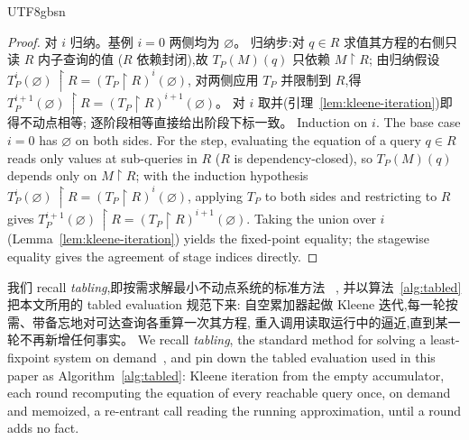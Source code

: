 \begin{CJK*}{UTF8}{gbsn}
\begin{proof}
\ifPaperChinese
  对 $i$ 归纳。基例 $i = 0$ 两侧均为 $\varnothing$。
  归纳步:对 $q \in R$ 求值其方程的右侧只读 $R$ 内子查询的值
  ($R$ 依赖封闭),故 $T_P(M)(q)$ 只依赖 $M{\restriction}R$;
  由归纳假设
  $T_P^i(\varnothing)\,{\restriction}R = (T_P{\restriction}R)^i(\varnothing)$,
  对两侧应用 $T_P$ 并限制到 $R$,得
  $T_P^{i+1}(\varnothing)\,{\restriction}R = (T_P{\restriction}R)^{i+1}(\varnothing)$。
  对 $i$ 取并(引理~\ref{lem:kleene-iteration})即得不动点相等;
  逐阶段相等直接给出阶段下标一致。
\else
  Induction on $i$. The base case $i = 0$ has $\varnothing$ on both
  sides. For the step, evaluating the equation of a query $q \in R$
  reads only values at sub-queries in $R$ ($R$ is dependency-closed),
  so $T_P(M)(q)$ depends only on $M{\restriction}R$; with the
  induction hypothesis
  $T_P^i(\varnothing)\,{\restriction}R = (T_P{\restriction}R)^i(\varnothing)$,
  applying $T_P$ to both sides and restricting to $R$ gives
  $T_P^{i+1}(\varnothing)\,{\restriction}R = (T_P{\restriction}R)^{i+1}(\varnothing)$.
  Taking the union over $i$ (Lemma~\ref{lem:kleene-iteration}) yields
  the fixed-point equality; the stagewise equality gives the agreement
  of stage indices directly.
\fi
\end{proof}

\ifPaperChinese
我们 recall \emph{tabling},即按需求解最小不动点系统的标准方法
~\cite{tamaki1986-tabled-resolution, chen1996-tabled-evaluation-delaying, vanemden1976-predicate-logic-semantics},
并以算法~\ref{alg:tabled} 把本文所用的 tabled evaluation 规范下来:
自空累加器起做 Kleene 迭代,每一轮按需、带备忘地对可达查询各重算一次其方程,
重入调用读取运行中的逼近,直到某一轮不再新增任何事实。
\else
We recall \emph{tabling}, the standard method for solving a
least-fixpoint system on
demand~\cite{tamaki1986-tabled-resolution, chen1996-tabled-evaluation-delaying, vanemden1976-predicate-logic-semantics},
and pin down the tabled evaluation used in this paper as
Algorithm~\ref{alg:tabled}: Kleene iteration from the empty
accumulator, each round recomputing the equation of every reachable
query once, on demand and memoized, a re-entrant call reading the
running approximation, until a round adds no fact.
\fi


\end{CJK*}
